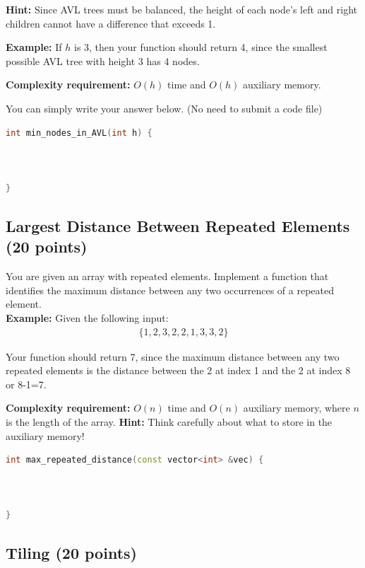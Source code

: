 \documentclass[11pt]{exam}
\begin{document}
\textbf{Hint: }Since AVL trees must be balanced, the height of each node's left and right children cannot have a difference that exceeds 1. 

\textbf{Example: }If $h$ is 3, then your function should return 4, since the smallest possible AVL tree with height 3 has 4 nodes.

\textbf{Complexity requirement:} $O(h)$ time and $O(h)$ auxiliary memory.

You can simply write your answer below. (No need to submit a code file)

\begin{solution}
\begin{lstlisting}[language=c++]
int min_nodes_in_AVL(int h) {



}
\end{lstlisting}
\end{solution}

\subsection{Largest Distance Between Repeated Elements (20 points)}
You are given an array with repeated elements. Implement a function that identifies the maximum distance between any two occurrences of a repeated element.\\

\textbf{Example:} Given the following input:
\begin{align*}
\{1,2,3,2,2,1,3,3,2\}
\end{align*}

Your function should return 7, since the maximum distance between any two repeated elements is the distance between the 2 at index 1 and the 2 at index 8 or 8-1=7.

\textbf{Complexity requirement:} $O(n)$ time and $O(n)$ auxiliary memory, where $n$ is the length of the array.
\textbf{Hint:} Think carefully about what to store in the auxiliary memory!

\begin{solution}
\begin{lstlisting}[language=c++]
int max_repeated_distance(const vector<int> &vec) {



}
\end{lstlisting}
\end{solution}

\subsection{Tiling (20 points)}
\end{document}
